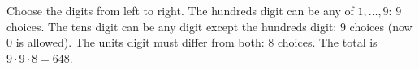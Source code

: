 Choose the digits from left to right. The hundreds digit can be any of $1,\dots,9$: $9$ choices. The tens digit can be any digit except the hundreds digit: $9$ choices (now $0$ is allowed). The units digit must differ from both: $8$ choices. The total is $9\cdot9\cdot8=\boxed{648}$.
